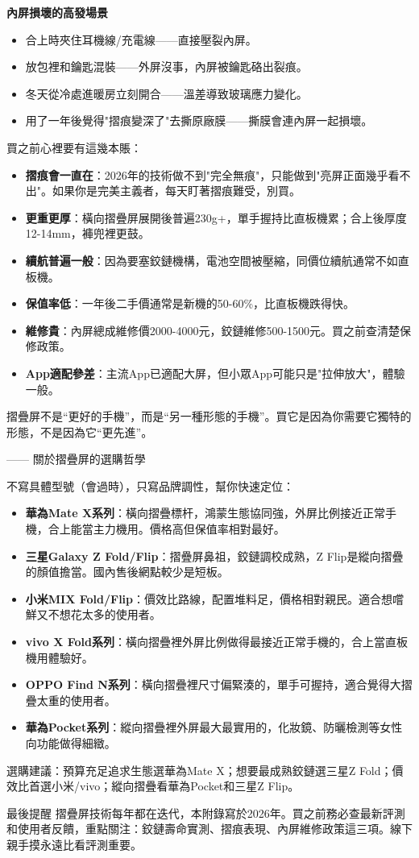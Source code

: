 \textbf{內屏損壞的高發場景}\par

\begin{itemize}
  \item 合上時夾住耳機線/充電線——直接壓裂內屏。
  \item 放包裡和鑰匙混裝——外屏沒事，內屏被鑰匙硌出裂痕。
  \item 冬天從冷處進暖房立刻開合——溫差導致玻璃應力變化。
  \item 用了一年後覺得"摺痕變深了"去撕原廠膜——撕膜會連內屏一起損壞。
\end{itemize}


買之前心裡要有這幾本賬：

\begin{itemize}
  \item \textbf{摺痕會一直在}：2026年的技術做不到"完全無痕"，只能做到"亮屏正面幾乎看不出"。如果你是完美主義者，每天盯著摺痕難受，別買。
  \item \textbf{更重更厚}：橫向摺疊屏展開後普遍230g+，單手握持比直板機累；合上後厚度12-14mm，褲兜裡更鼓。
  \item \textbf{續航普遍一般}：因為要塞鉸鏈機構，電池空間被壓縮，同價位續航通常不如直板機。
  \item \textbf{保值率低}：一年後二手價通常是新機的50-60\%，比直板機跌得快。
  \item \textbf{維修貴}：內屏總成維修價2000-4000元，鉸鏈維修500-1500元。買之前查清楚保修政策。
  \item \textbf{App適配參差}：主流App已適配大屏，但小眾App可能只是"拉伸放大"，體驗一般。
\end{itemize}

摺疊屏不是“更好的手機”，而是“另一種形態的手機”。買它是因為你需要它獨特的形態，不是因為它“更先進”。

—— 關於摺疊屏的選購哲學


不寫具體型號（會過時），只寫品牌調性，幫你快速定位：

\begin{itemize}
  \item \textbf{華為Mate X系列}：橫向摺疊標杆，鴻蒙生態協同強，外屏比例接近正常手機，合上能當主力機用。價格高但保值率相對最好。
  \item \textbf{三星Galaxy Z Fold/Flip}：摺疊屏鼻祖，鉸鏈調校成熟，Z Flip是縱向摺疊的顏值擔當。國內售後網點較少是短板。
  \item \textbf{小米MIX Fold/Flip}：價效比路線，配置堆料足，價格相對親民。適合想嚐鮮又不想花太多的使用者。
  \item \textbf{vivo X Fold系列}：橫向摺疊裡外屏比例做得最接近正常手機的，合上當直板機用體驗好。
  \item \textbf{OPPO Find N系列}：橫向摺疊裡尺寸偏緊湊的，單手可握持，適合覺得大摺疊太重的使用者。
  \item \textbf{華為Pocket系列}：縱向摺疊裡外屏最大最實用的，化妝鏡、防曬檢測等女性向功能做得細緻。
\end{itemize}

選購建議：預算充足追求生態選華為Mate X；想要最成熟鉸鏈選三星Z Fold；價效比首選小米/vivo；縱向摺疊看華為Pocket和三星Z Flip。

\begin{tcbinfo}{最後提醒}
摺疊屏技術每年都在迭代，本附錄寫於2026年。買之前務必查最新評測和使用者反饋，重點關注：鉸鏈壽命實測、摺痕表現、內屏維修政策這三項。線下親手摸永遠比看評測重要。

\end{tcbinfo}
